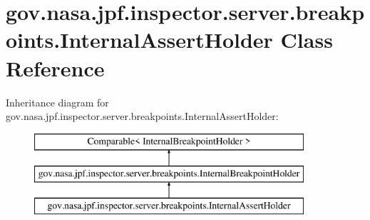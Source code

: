 \hypertarget{classgov_1_1nasa_1_1jpf_1_1inspector_1_1server_1_1breakpoints_1_1_internal_assert_holder}{}\section{gov.\+nasa.\+jpf.\+inspector.\+server.\+breakpoints.\+Internal\+Assert\+Holder Class Reference}
\label{classgov_1_1nasa_1_1jpf_1_1inspector_1_1server_1_1breakpoints_1_1_internal_assert_holder}
Inheritance diagram for gov.\+nasa.\+jpf.\+inspector.\+server.\+breakpoints.\+Internal\+Assert\+Holder\+:\begin{figure}[H]
\begin{center}
\leavevmode
\includegraphics[height=3.000000cm]{classgov_1_1nasa_1_1jpf_1_1inspector_1_1server_1_1breakpoints_1_1_internal_assert_holder}
\end{center}
\end{figure}
